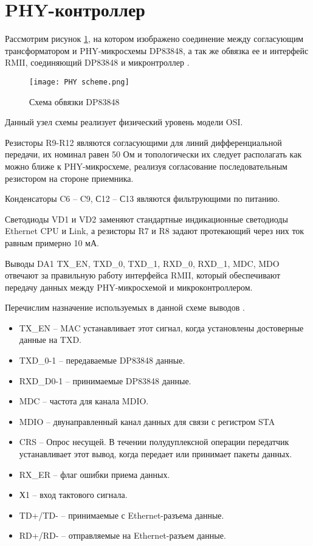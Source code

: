 \section{PHY-контроллер}
\hspace{1cm} 


Рассмотрим рисунок \ref{ris:PhyScheme}, на котором изображено соединение между согласующим трансформатором 
и PHY-микросхемы DP83848, а так же обвязка ее и интерфейс RMII, соединяющий DP83848 и микронтроллер 
\cite{DP83848:datasheet}. 

\begin{figure}[H]
\centering
\texttt{[image: PHY scheme.png]}
\caption{Схема обвязки DP83848}
\label{ris:PhyScheme}
\end{figure}

Данный узел схемы реализует физический уровень модели OSI. 

Резисторы R9-R12 являются согласующими для линий дифференциальной передачи, их номинал равен 50 Ом и топологически 
их следует располагать как можно ближе к PHY-микросхеме, реализуя согласование последовательным резистором на 
стороне приемника. 

Конденсаторы C6 -- C9, С12 -- С13 являются фильтрующими по питанию. 

Светодиоды VD1 и VD2 заменяют стандартные индикационные светодиоды Ethernet CPU и Link, а резисторы 
R7 и R8 задают протекающий через них ток равным примерно 10 мА.  

Выводы DA1 TX\_EN, TXD\_0, TXD\_1, RXD\_0, RXD\_1, MDC, MDO отвечают за правильную работу интерфейса
RMII, который обеспечивают передачу данных между PHY-микросхемой и микроконтроллером. 

Перечислим назначение используемых в данной схеме выводов \cite{DP83848:datasheet}.
\begin{itemize}
    \item TX\_EN -- MAC устанавливает этот сигнал, когда установлены достоверные данные на TXD.
    \item TXD\_0-1 -- передаваемые DP83848 данные.
    \item RXD\_D0-1 -- принимаемые DP83848 данные.
    \item MDC -- частота для канала MDIO.
    \item MDIO -- двунаправленный канал данных для связи с регистром STA
    \item CRS -- Опрос несущей. В течении полудуплексной операции передатчик устанавливает этот 
    вывод, когда передает или принимает пакеты данных. 
    \item RX\_ER -- флаг ошибки приема данных. 
    \item Х1 -- вход тактового сигнала.
    \item TD+/TD- -- принимаемые с Ethernet-разъема данные.
    \item RD+/RD- -- отправляемые на Ethernet-разъем данные.
\end{itemize}